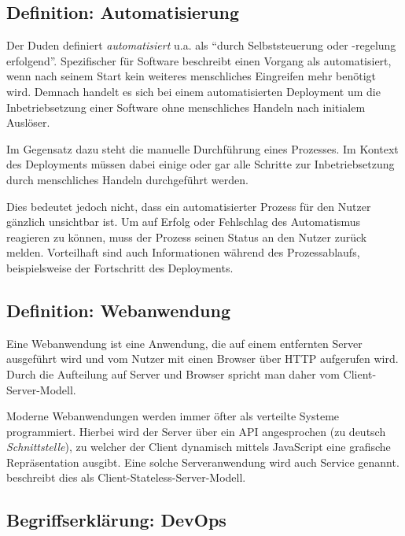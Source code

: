 \subsection{Definition: Automatisierung}

Der Duden \citeyearpar{Duden} definiert \emph{automatisiert} u.a. als ``durch Selbststeuerung oder -regelung erfolgend''. Spezifischer für Software beschreibt \citet[27]{Duvall2007} einen Vorgang als automatisiert, wenn nach seinem Start kein weiteres menschliches Eingreifen mehr benötigt wird. Demnach handelt es sich bei einem automatisierten Deployment um die Inbetriebsetzung einer Software ohne menschliches Handeln nach initialem Auslöser.

Im Gegensatz dazu steht die manuelle Durchführung eines Prozesses. Im Kontext des Deployments müssen dabei einige oder gar alle Schritte zur Inbetriebsetzung durch menschliches Handeln durchgeführt werden.

Dies bedeutet jedoch nicht, dass ein automatisierter Prozess für den Nutzer gänzlich unsichtbar ist. Um auf Erfolg oder Fehlschlag des Automatismus reagieren zu können, muss der Prozess seinen Status an den Nutzer zurück melden. Vorteilhaft sind auch Informationen während des Prozessablaufs, beispielsweise der Fortschritt des Deployments. \citep[10f]{Duvall2007}

\subsection{Definition: Webanwendung}

Eine Webanwendung ist eine Anwendung, die auf einem entfernten Server ausgeführt wird und vom Nutzer mit einen Browser über \ac{HTTP} aufgerufen wird. Durch die Aufteilung auf Server und Browser spricht man daher vom Client-Server-Modell.

Moderne Webanwendungen werden immer öfter als verteilte Systeme programmiert. Hierbei wird der Server über ein \ac{API} angesprochen (zu deutsch \emph{Schnittstelle}), zu welcher der Client dynamisch mittels JavaScript eine grafische Repräsentation ausgibt. Eine solche Serveranwendung wird auch Service genannt. \cite[Kapitel 5.1.3]{Fielding} beschreibt dies als Client-Stateless-Server-Modell.

\subsection{Begriffserklärung: DevOps}
\label{subsec:devops}

